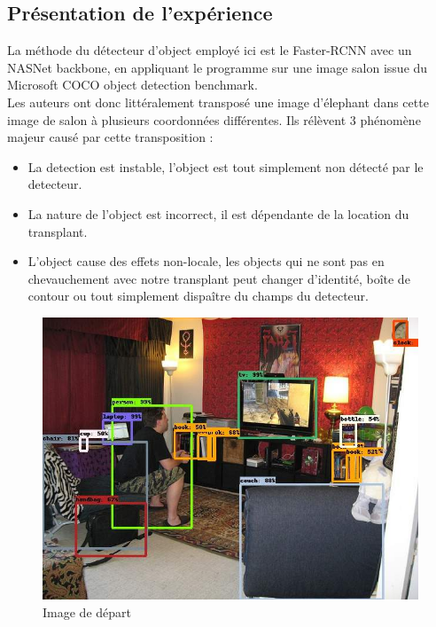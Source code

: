 \documentclass[12pt, letterpaper]{article}
\begin{document}
\subsection{Présentation de l'expérience}
La méthode du détecteur d'object employé ici est le Faster-RCNN avec un NASNet backbone, en appliquant le programme sur 
une image salon issue du Microsoft COCO object detection benchmark. \\
Les auteurs ont donc littéralement transposé une image d'élephant dans cette image de salon à plusieurs
coordonnées différentes. Ils rélèvent 3 phénomène majeur causé par cette transposition :\\
\begin{itemize}
    \item La detection est instable, l'object est tout simplement non détecté par le detecteur.
    \item La nature de l'object est incorrect, il est dépendante de la location du transplant.
    \item L'object cause des effets non-locale, les objects qui ne sont pas en chevauchement avec notre transplant peut changer d'identité, boîte de contour ou tout simplement 
        dispaître du champs du detecteur.
\end{itemize}
\begin{figure}[H]
    \includegraphics[width=\linewidth]{img/fig12.jpg}
    \caption{Image de départ}
    \label{fig:L11}
\end{figure}
\end{document}

